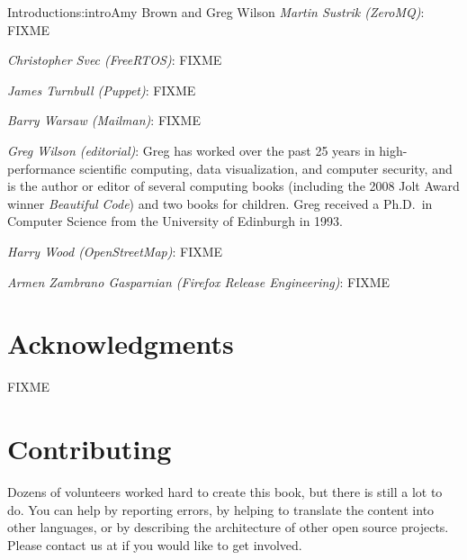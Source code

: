 \begin{aosachapter}{Introduction}{s:intro}{Amy Brown and Greg Wilson}
\emph{Martin Sustrik (ZeroMQ)}: FIXME

\emph{Christopher Svec (FreeRTOS)}: FIXME

\emph{James Turnbull (Puppet)}: FIXME

\emph{Barry Warsaw (Mailman)}: FIXME

\emph{Greg Wilson (editorial)}: Greg has worked over the past 25 years
in high-performance scientific computing, data visualization, and
computer security, and is the author or editor of several computing
books (including the 2008 Jolt Award winner \emph{Beautiful Code}) and
two books for children.  Greg received a Ph.D.\ in Computer Science
from the University of Edinburgh in 1993.

\emph{Harry Wood (OpenStreetMap)}: FIXME

\emph{Armen Zambrano Gasparnian (Firefox Release Engineering)}: FIXME

\section*{Acknowledgments}

FIXME

\section*{Contributing}

Dozens of volunteers worked hard to create this book, but there is
still a lot to do.  You can help by reporting errors, by helping to
translate the content into other languages, or by describing the
architecture of other open source projects.  Please contact us at
 if you would like to get involved.

\end{aosachapter}

